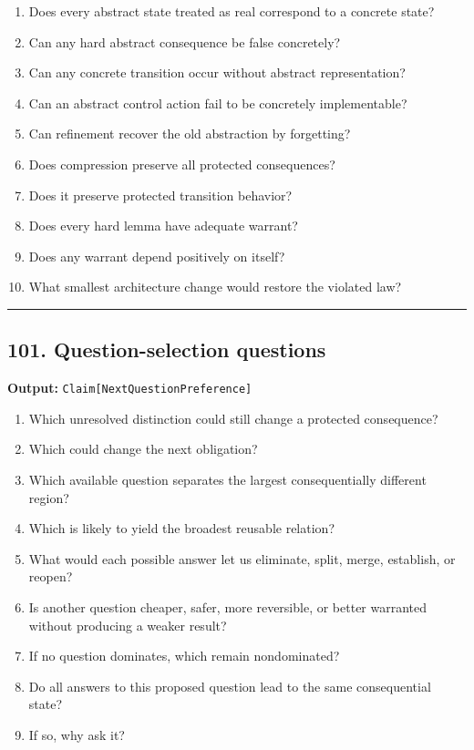 \documentclass[
]{article}
\providecommand{\tightlist}{%
  \setlength{\itemsep}{0pt}\setlength{\parskip}{0pt}}
\begin{document}
\begin{enumerate}
\def\labelenumi{\arabic{enumi}.}
\tightlist
\item
  Does every abstract state treated as real correspond to a concrete
  state?
\item
  Can any hard abstract consequence be false concretely?
\item
  Can any concrete transition occur without abstract representation?
\item
  Can an abstract control action fail to be concretely implementable?
\item
  Can refinement recover the old abstraction by forgetting?
\item
  Does compression preserve all protected consequences?
\item
  Does it preserve protected transition behavior?
\item
  Does every hard lemma have adequate warrant?
\item
  Does any warrant depend positively on itself?
\item
  What smallest architecture change would restore the violated law?
\end{enumerate}

\begin{center}\rule{0.5\linewidth}{0.5pt}\end{center}

\subsection{101. Question-selection
questions}\label{question-selection-questions}

\textbf{Output:} \texttt{Claim{[}NextQuestionPreference{]}}

\begin{enumerate}
\def\labelenumi{\arabic{enumi}.}
\tightlist
\item
  Which unresolved distinction could still change a protected
  consequence?
\item
  Which could change the next obligation?
\item
  Which available question separates the largest consequentially
  different region?
\item
  Which is likely to yield the broadest reusable relation?
\item
  What would each possible answer let us eliminate, split, merge,
  establish, or reopen?
\item
  Is another question cheaper, safer, more reversible, or better
  warranted without producing a weaker result?
\item
  If no question dominates, which remain nondominated?
\item
  Do all answers to this proposed question lead to the same
  consequential state?
\item
  If so, why ask it?
\end{enumerate}
\end{document}
